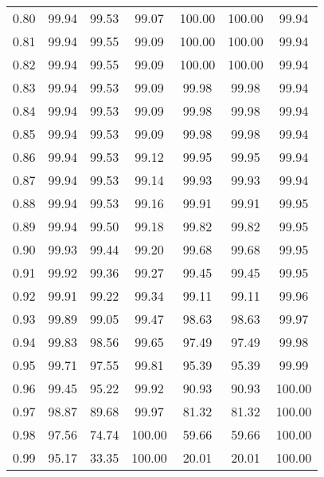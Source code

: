 \begin{tabular}{|c|c|c|c|c|c|c|}
      0.80 &     99.94 &     99.53 &      99.07 &  100.00 &     100.00 &         99.94 \\
      0.81 &     99.94 &     99.55 &      99.09 &  100.00 &     100.00 &         99.94 \\
      0.82 &     99.94 &     99.55 &      99.09 &  100.00 &     100.00 &         99.94 \\
      0.83 &     99.94 &     99.53 &      99.09 &   99.98 &      99.98 &         99.94 \\
      0.84 &     99.94 &     99.53 &      99.09 &   99.98 &      99.98 &         99.94 \\
      0.85 &     99.94 &     99.53 &      99.09 &   99.98 &      99.98 &         99.94 \\
      0.86 &     99.94 &     99.53 &      99.12 &   99.95 &      99.95 &         99.94 \\
      0.87 &     99.94 &     99.53 &      99.14 &   99.93 &      99.93 &         99.94 \\
      0.88 &     99.94 &     99.53 &      99.16 &   99.91 &      99.91 &         99.95 \\
      0.89 &     99.94 &     99.50 &      99.18 &   99.82 &      99.82 &         99.95 \\
      0.90 &     99.93 &     99.44 &      99.20 &   99.68 &      99.68 &         99.95 \\
      0.91 &     99.92 &     99.36 &      99.27 &   99.45 &      99.45 &         99.95 \\
      0.92 &     99.91 &     99.22 &      99.34 &   99.11 &      99.11 &         99.96 \\
      0.93 &     99.89 &     99.05 &      99.47 &   98.63 &      98.63 &         99.97 \\
      0.94 &     99.83 &     98.56 &      99.65 &   97.49 &      97.49 &         99.98 \\
      0.95 &     99.71 &     97.55 &      99.81 &   95.39 &      95.39 &         99.99 \\
      0.96 &     99.45 &     95.22 &      99.92 &   90.93 &      90.93 &        100.00 \\
      0.97 &     98.87 &     89.68 &      99.97 &   81.32 &      81.32 &        100.00 \\
      0.98 &     97.56 &     74.74 &     100.00 &   59.66 &      59.66 &        100.00 \\
      0.99 &     95.17 &     33.35 &     100.00 &   20.01 &      20.01 &        100.00 \\
\bottomrule
\end{tabular}
